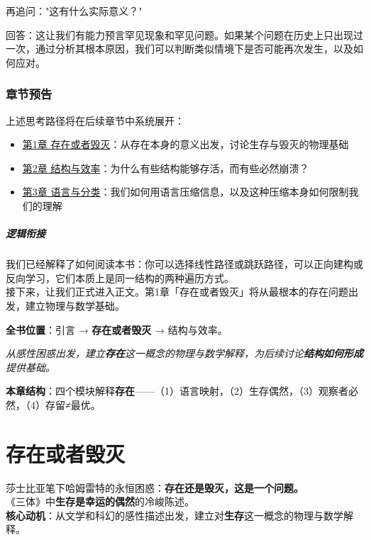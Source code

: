 \documentclass[openany, a4paper, 12pt]{book}
\newenvironment{motivation}{
	\vspace{0.5em}
	\begin{tcolorbox}[
		colback=gray!10,           %
		colframe=gray!60,          %
		title=\textit{本章动机 (Motivation)},
		fonttitle=\bfseries,
		arc=0mm,                   %
		leftrule=3mm               %
		]
		\small \itshape %
	}{
	\end{tcolorbox}
	\vspace{1em}
}
\begin{document}
再追问："这有什么实际意义？"

回答：这让我们有能力预言罕见现象和罕见问题。如果某个问题在历史上只出现过一次，通过分析其根本原因，我们可以判断类似情境下是否可能再次发生，以及如何应对。


	\subsection{章节预告}

上述思考路径将在后续章节中系统展开：
\begin{itemize}
	\item \hyperref[ch:existence]{第1章 存在或者毁灭}：从存在本身的意义出发，讨论生存与毁灭的物理基础
	\item \hyperref[ch:structure]{第2章 结构与效率}：为什么有些结构能够存活，而有些必然崩溃？
	\item \hyperref[ch:language]{第3章 语言与分类}：我们如何用语言压缩信息，以及这种压缩本身如何限制我们的理解
\end{itemize}

	\paragraph*{逻辑衔接}
	我们已经解释了如何阅读本书：你可以选择线性路径或跳跃路径，可以正向建构或反向学习，它们本质上是同一结构的两种遍历方式。\\
	接下来，让我们正式进入正文。第1章「存在或者毁灭」将从最根本的存在问题出发，建立物理与数学基础。



	\textbf{\large 全书位置}：引言 → \textbf{存在或者毁灭} → 结构与效率。

	\textit{从感性困惑出发，建立\textbf{存在}这一概念的物理与数学解释，为后续讨论\textbf{结构如何形成}提供基础。}

	\vspace{1em}

	\textbf{\large 本章结构}：四个模块解释\textbf{存在}——（1）语言映射，（2）生存偶然，（3）观察者必然，（4）存留≠最优。

	\vspace{1em}

	\chapter{存在或者毁灭}
	
\label{ch:existence}
\begin{motivation}
	莎士比亚笔下哈姆雷特的永恒困惑：\textbf{存在还是毁灭，这是一个问题。}\\
	《三体》中\textbf{生存是幸运的偶然}的冷峻陈述。\\
	\textbf{核心动机}：从文学和科幻的感性描述出发，建立对\textbf{生存}这一概念的物理与数学解释。
\end{motivation}
\end{document}
